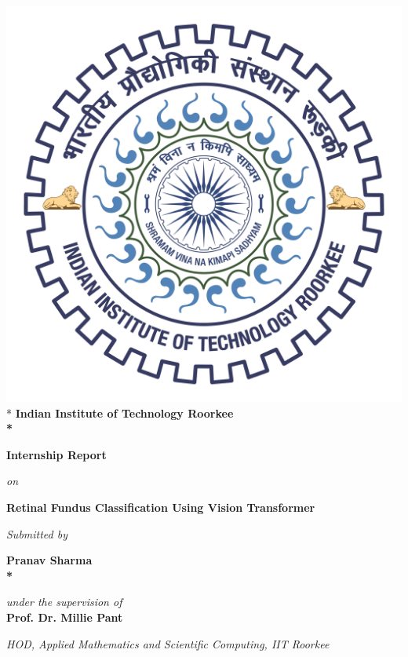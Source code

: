 \documentclass[a4paper,12pt]{report}
\begin{document}
\title{}
\begin{center}
\thispagestyle{empty}
 \includegraphics[scale=0.095]{logo.pdf}\\*
\Large\bfseries{Indian Institute of Technology Roorkee}\\*
\vspace{1.5cm}
\end{center}
\begin{center}
\Large\bfseries{Internship Report}
\end{center}
\begin{center}
\textit{on}
\end{center}
\begin{center}
\Large\bfseries{Retinal Fundus Classification Using Vision Transformer}
\end{center}
\begin{center}
\textit{Submitted by}
\end{center}
\vspace{0.4cm}
\begin{center}
\Large\bfseries{Pranav Sharma}\\*
\end{center}
\vspace{0.5cm}
\begin{center}
\textit{under the supervision of}\\
\vspace{0.5cm}
\Large\bfseries{Prof. Dr.  Millie Pant}\\
\end{center}
\begin{center}
\textit{HOD, Applied Mathematics and Scientific Computing, IIT Roorkee}\\
\end{center}
\begin{center}
\end{center}
\end{document}
